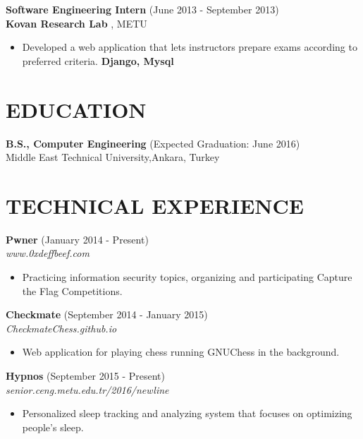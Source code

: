 \documentclass[margin, 10pt]{res} %
\begin{document}
\begin{resume}
{\bf Software Engineering Intern} \hfill (June 2013 - September 2013) \\
{\bf Kovan Research Lab }, METU
\begin{itemize}
\item Developed a web application that lets instructors prepare exams according to preferred criteria. {\bf Django, Mysql }
\end{itemize} 





\section{EDUCATION}

{\bf B.S., Computer Engineering } \hfill {(Expected Graduation: June 2016)}\\
Middle East Technical University,Ankara, Turkey


\section{TECHNICAL EXPERIENCE}

{\bf Pwner} \hfill (January 2014 - Present) \\
\textit{www.0xdeffbeef.com}
\begin{itemize} 
\item Practicing information security topics, organizing and participating Capture the Flag Competitions. 
\end{itemize} 

{\bf Checkmate} \hfill (September 2014 - January 2015) \\
\textit{CheckmateChess.github.io}
\begin{itemize} 
\item Web application for playing chess running GNUChess in the background.
\end{itemize} 

{\bf Hypnos} \hfill (September 2015 - Present) \\
\textit{senior.ceng.metu.edu.tr/2016/newline}
\begin{itemize} 
\item Personalized sleep tracking and analyzing system that focuses on optimizing people's sleep.
\end{itemize} 





\newpage











\end{resume}
\end{document}
